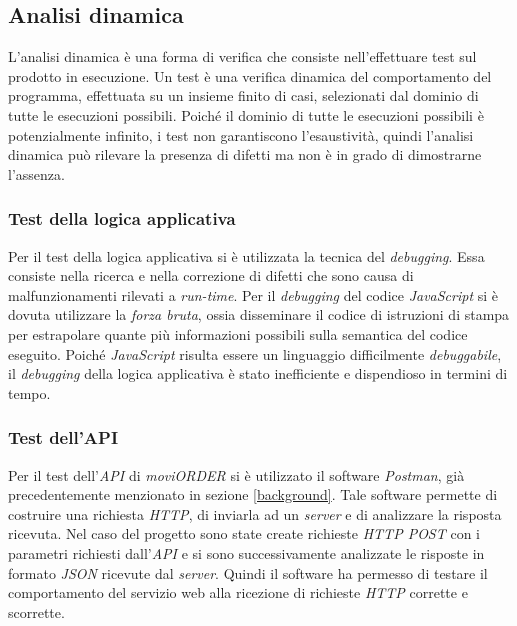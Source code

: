 \subsection{Analisi dinamica}

L'analisi dinamica è una forma di verifica che consiste nell'effettuare test sul prodotto in esecuzione. Un test è una verifica dinamica del comportamento del programma, effettuata su un insieme finito di casi, selezionati dal dominio di tutte le esecuzioni possibili. Poiché il dominio di tutte le esecuzioni possibili è potenzialmente infinito, i test non garantiscono l'esaustività, quindi l'analisi dinamica può rilevare la presenza di difetti ma non è in grado di dimostrarne l'assenza.

\subsubsection{Test della logica applicativa}

Per il test della logica applicativa si è utilizzata la tecnica del \textit{debugging}. Essa consiste nella ricerca e nella correzione di difetti che sono causa di malfunzionamenti rilevati a \textit{run-time}. Per il \textit{debugging} del codice \textit{JavaScript} si è dovuta utilizzare la \textit{forza bruta}, ossia disseminare il codice di istruzioni di stampa per estrapolare quante più informazioni possibili sulla semantica del codice eseguito. Poiché \textit{JavaScript} risulta essere un linguaggio difficilmente \textit{debuggabile}, il \textit{debugging} della logica applicativa è stato inefficiente e dispendioso in termini di tempo.

\subsubsection{Test dell'API}

Per il test dell'\textit{API} di \textit{moviORDER} si è utilizzato il software \textit{Postman}, già precedentemente menzionato in sezione \ref{background}. Tale software permette di costruire una richiesta \textit{HTTP}, di inviarla ad un \textit{server} e di analizzare la risposta ricevuta. Nel caso del progetto sono state create richieste \textit{HTTP POST} con i parametri richiesti dall'\textit{API} e si sono successivamente analizzate le risposte in formato \textit{JSON} ricevute dal \textit{server}.
Quindi il software ha permesso di testare il comportamento del servizio web alla ricezione di richieste \textit{HTTP} corrette e scorrette.


